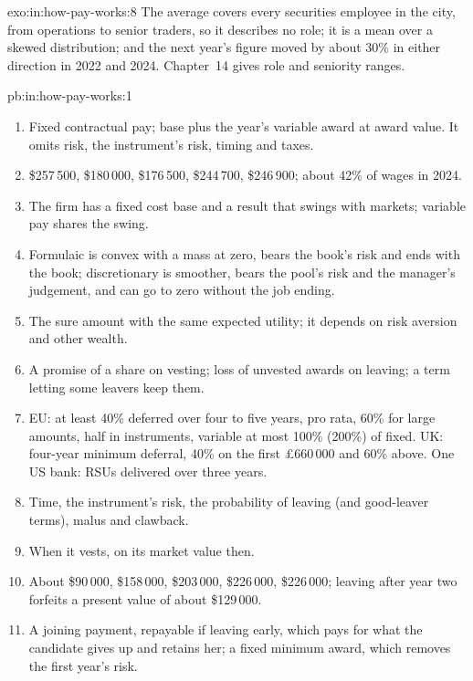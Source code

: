\begin{solution}{exo:in:how-pay-works:8}
The average covers every securities employee in the city, from operations to senior traders, so it describes no role;
it is a mean over a skewed distribution; and the next year's figure moved by about 30\% in either direction in 2022 and 2024. Chapter~14 gives role and
seniority ranges.
\end{solution}

\begin{solution}{pb:in:how-pay-works:1}
\begin{enumerate}
\item Fixed contractual pay; base plus the year's variable award at award value. It omits  risk, the
instrument's risk, timing and taxes.
\item \$257\,500, \$180\,000, \$176\,500, \$244\,700, \$246\,900; about 42\% of wages in 2024.
\item The firm has a fixed cost base and a result that swings with markets; variable pay shares the swing.
\item Formulaic is convex with a mass at zero, bears the book's risk and ends with the book; discretionary is smoother,
bears the pool's risk and the manager's judgement, and can go to zero without the job ending.
\item The sure amount with the same expected utility; it depends on risk aversion and other wealth.
\item A promise of a share on vesting; loss of unvested awards on leaving; a term letting some leavers keep them.
\item EU: at least 40\% deferred over four to five years, pro rata, 60\% for large amounts, half in instruments,
variable at most 100\% (200\%) of fixed. UK: four-year minimum deferral, 40\% on the first \pounds660\,000 and 60\% above.
One US bank: RSUs delivered over three years.
\item Time, the instrument's risk, the probability of leaving (and good-leaver terms), malus and clawback.
\item When it vests, on its market value then.
\item About \$90\,000, \$158\,000, \$203\,000, \$226\,000, \$226\,000; leaving after year two forfeits a present value of
about \$129\,000.
\item A joining payment, repayable if leaving early, which pays for what the candidate gives up and retains her; a fixed
minimum award, which removes the first year's risk.

\end{enumerate}
\end{solution}

